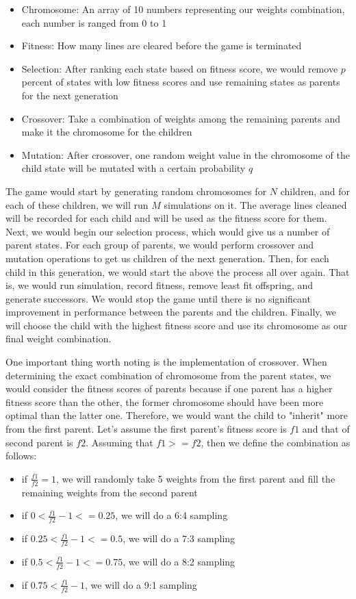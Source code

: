 \documentclass[letterpaper]{article} %
\begin{document}
\begin{itemize}
 \item Chromosome: An array of 10 numbers representing our weights combination, each number is ranged from 0 to 1
 \item Fitness: How many lines are cleared before the game is terminated
 \item Selection: After ranking each state based on fitness score, we would remove $p$ percent of states with low fitness scores and use remaining states as parents for the next generation
 \item Crossover: Take a combination of weights among the remaining parents and make it the chromosome for the children
 \item Mutation: After crossover, one random weight value in the chromosome of the child state will be mutated with a certain probability $q$
\end{itemize}


The game would start by generating random chromosomes for $N$ children, and for each of these children, we will run $M$ simulations on it. The average lines cleaned will be recorded for each child and will be used as the fitness score for them. Next, we would begin our selection process, which would give us a number of parent states. For each group of parents, we would perform crossover and mutation operations to get us children of the next generation. Then, for each child in this generation, we would start the above the process all over again. That is, we would run simulation, record fitness, remove least fit offspring, and generate successors. We would stop the game until there is no significant improvement in performance between the parents and the children. Finally, we will choose the child with the highest fitness score and use its chromosome as our final weight combination. 

One important thing worth noting is the implementation of crossover. When determining the exact combination of chromosome from the parent states, we would consider the fitness scores of parents because if one parent has a higher fitness score than the other, the former chromosome should have been more optimal than the latter one. Therefore, we would want the child to "inherit" more from the first parent. Let's assume the first parent's fitness score is $f1$ and that of second parent is $f2$. Assuming that $f1 >= f2$, then we define the combination as follows: 
 
 \begin{itemize}
 \item if $\frac{f1}{f2} = 1$, we will randomly take 5 weights from the first parent and fill the remaining weights from the second parent
 \item if $0 < \frac{f1}{f2} - 1 <= 0.25$, we will do a 6:4 sampling
 \item if $0.25 < \frac{f1}{f2} - 1 <= 0.5$, we will do a 7:3 sampling
 \item if $0.5 < \frac{f1}{f2} - 1 <= 0.75$, we will do a 8:2 sampling
 \item if $0.75 < \frac{f1}{f2} - 1$, we will do a 9:1 sampling
 \end{itemize}
\end{document}
